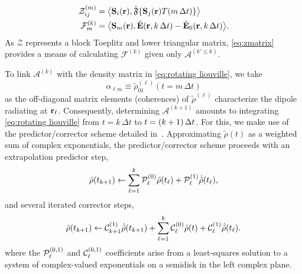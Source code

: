 \begin{subequations}
  \begin{align}
    \mathcal{Z}^{(m)}_{ij} &= \big\langle \mathbf{S}_i(\vb{r}), \tilde{\mathfrak{F}}\{ \mathbf{S}_j(\mathbf{r}) T(m \, \Delta t) \} \big\rangle \\
    \mathcal{F}^{(k)}_m &= \big\langle \mathbf{S}_m(\vb{r}), \tilde{\mathbf{E}}(\vb{r}, k \, \Delta t) - \tilde{\mathbf{E}}_0(\vb{r}, k \, \Delta t) \big\rangle.
  \end{align}
  \label{eq:projections}
\end{subequations}
As $\mathcal{Z}$ represents a block Toeplitz and lower triangular matrix, \cref{eq:zmatrix} provides a means of calculating $\mathcal{F}^{(k)}$ given only $\mathcal{A}^{(k' \le k)}$.

To link $\mathcal{A}^{(k)}$ with the density matrix in \cref{eq:rotating liouville}, we take
\begin{equation}
  \alpha_{\ell m} \equiv \tilde{\rho}_{01}^{(\ell)}(t = m \, \Delta t)
  \label{eq:polarization definition}
\end{equation}
as the off-diagonal matrix elements (coherences) of $\tilde{\rho}^{(\ell)}$ characterize the dipole radiating at $\vb{r}_\ell$.
Consequently, determining $\mathcal{A}^{(k + 1)}$ amounts to integrating \cref{eq:rotating liouville} from $t = k \, \Delta t$ to $t = \qty(k + 1) \, \Delta t$.
For this, we make use of the predictor/corrector scheme detailed in~\cite{Glaser2009}.
Approximating $\tilde{\rho}(t)$ as a weighted sum of complex exponentials, the predictor/corrector scheme proceeds with an extrapolation predictor step,
\begin{equation}
  \tilde{\rho}(t_{k + 1}) \leftarrow \sum_{\ell = 1}^k \mathcal{P}_\ell^{\qty(0)} \tilde{\rho}(t_\ell) + \mathcal{P}_\ell^{\qty(1)} \dot{\tilde{\rho}}(t_\ell),
  \label{eq:predictor}
\end{equation}
and several iterated corrector steps,
\begin{equation}
  \tilde{\rho}(t_{k + 1}) \leftarrow \mathcal{C}_{k+1}^{\qty(1)} \dot{\tilde{\rho}}(t_{k + 1}) + \sum_{\ell = 1}^k \mathcal{C}_\ell^{\qty(0)} \tilde{\rho}(t) + \mathcal{C}_\ell^{\qty(1)} \dot{\tilde{\rho}}(t_\ell).
  \label{eq:corrector}
\end{equation}
where the $\mathcal{P}_\ell^{\qty(0, 1)}$ and $\mathcal{C}_\ell^{\qty(0, 1)}$ coefficients arise from a least-squares solution to a system of complex-valued exponentials on a semidisk in the left complex plane.
